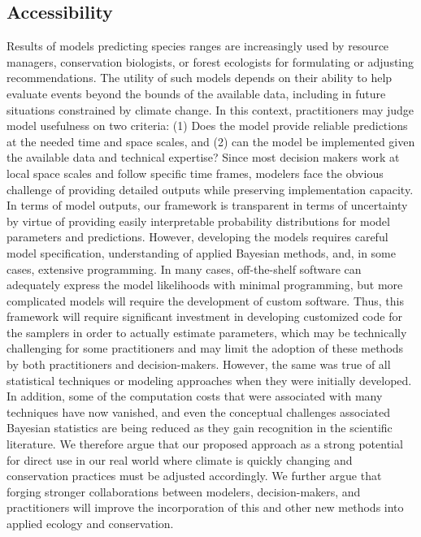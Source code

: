\subsection*{Accessibility}
Results of models predicting species ranges are increasingly used by resource managers, conservation biologists, or forest ecologists for formulating or adjusting recommendations. 
The utility of such models depends on their ability to help evaluate events beyond the bounds of the available data, including in future situations constrained by climate change. 
In this context, practitioners may judge model usefulness on two criteria: (1) Does the model provide reliable predictions at the needed time and space scales, and (2) can the model be implemented given the available data and technical expertise? 
Since most decision makers work at local space scales and follow specific time frames, modelers face the obvious challenge of providing detailed outputs while preserving implementation capacity.
In terms of model outputs, our framework is transparent in terms of uncertainty by virtue of providing easily interpretable probability distributions for model parameters and predictions.
However, developing the models requires careful model specification, understanding of applied Bayesian methods, and, in some cases, extensive programming.
In many cases, off-the-shelf software \citep[e.g.,][]{R, RJAGS} can adequately express the model likelihoods with minimal programming, but more complicated models will require the development of custom software.
Thus, this framework will require significant investment in developing customized code for the samplers in order to actually estimate parameters, which may be technically challenging for some practitioners and may limit the adoption of these methods by both practitioners and decision-makers.
However, the same was true of all statistical techniques or modeling approaches when they were initially developed. 
In addition, some of the computation costs that were associated with many techniques have now vanished, and even the conceptual challenges associated Bayesian statistics are being reduced as they gain recognition in the scientific literature. 
We therefore argue that our proposed approach as a strong potential for direct use in our real world where climate is quickly changing and conservation practices must be adjusted accordingly.
We further argue that forging stronger collaborations between modelers, decision-makers, and practitioners will improve the incorporation of this and other new methods into applied ecology and conservation.

